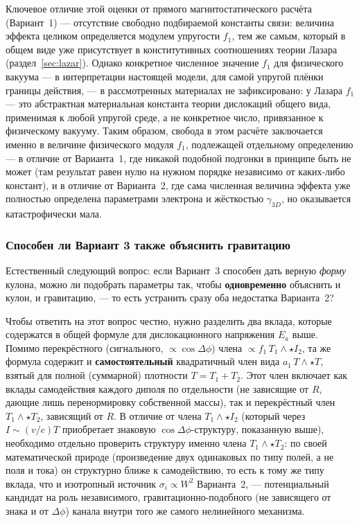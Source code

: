 \documentclass[12pt,a4paper]{article}
\begin{document}
Ключевое отличие этой оценки от прямого магнитостатического расчёта
(Вариант~1) --- отсутствие свободно подбираемой константы связи:
величина эффекта целиком определяется модулем упругости $f_1$, тем
же самым, который в общем виде уже присутствует в конститутивных
соотношениях теории Лазара (раздел~\ref{sec:lazar}). Однако конкретное
численное значение $f_1$ для физического вакуума --- в интерпретации
настоящей модели, для самой упругой плёнки границы действия, --- в
рассмотренных материалах не зафиксировано: у Лазара $f_1$ --- это
абстрактная материальная константа теории дислокаций общего вида,
применимая к любой упругой среде, а не конкретное число, привязанное
к физическому вакууму. Таким образом, свобода в этом расчёте
заключается именно в величине физического модуля $f_1$, подлежащей
отдельному определению --- в отличие от Варианта~1, где никакой
подобной подгонки в принципе быть не может (там результат равен нулю
на нужном порядке независимо от каких-либо констант), и в отличие от
Варианта~2, где сама численная величина эффекта уже полностью
определена параметрами электрона и жёсткостью $\gamma_{3D}$, но
оказывается катастрофически мала.

\subsubsection{Способен ли Вариант 3 также объяснить гравитацию}

Естественный следующий вопрос: если Вариант~3 способен дать верную
\emph{форму} кулона, можно ли подобрать параметры так, чтобы
\textbf{одновременно} объяснить и кулон, и гравитацию, --- то есть
устранить сразу оба недостатка Варианта~2?

Чтобы ответить на этот вопрос честно, нужно разделить два вклада,
которые содержатся в общей формуле для дислокационного напряжения
$E_a$ выше. Помимо перекрёстного (сигнального, $\propto\cos\Delta\phi$)
члена $\propto f_1\,T_1\wedge\star I_2$, та же формула содержит и
\textbf{самостоятельный} квадратичный член вида $a_1\,T\wedge\star T$,
взятый для полной (суммарной) плотности $T=T_1+T_2$. Этот член
включает как вклады самодействия каждого диполя по отдельности (не
зависящие от $R$, дающие лишь перенормировку собственной массы), так и
перекрёстный член $T_1\wedge\star T_2$, зависящий от $R$. В отличие от
члена $T_1\wedge\star I_2$ (который через $I\sim(v/c)T$ приобретает
знаковую $\cos\Delta\phi$-структуру, показанную выше), необходимо
отдельно проверить структуру именно члена $T_1\wedge\star T_2$: по
своей математической природе (произведение двух одинаковых по типу
полей, а не поля и тока) он структурно ближе к самодействию, то есть
к тому же типу вклада, что и изотропный источник $\sigma_i\propto W^2$
Варианта~2, --- потенциальный кандидат на роль независимого,
гравитационно-подобного (не зависящего от знака и от $\Delta\phi$)
канала внутри того же самого нелинейного механизма.
\end{document}
